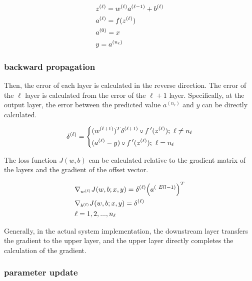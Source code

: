 \begin{content}
\begin{content}
\[\begin{gathered}
  {z^{(\ell )}} = {w^{(\ell )}}{a^{(\ell - 1)}} + {b^{(\ell )}} \hfill \\
  {a^{(\ell )}} = f({z^{(\ell )}}) \hfill \\
  {a^{(0)}} = x \hfill \\
  y = {a^{({n_\ell })}} \hfill \\ 
\end{gathered} \]

\subsubsection{backward propagation}

Then, the error of each layer is calculated in the reverse direction. The error of the $\ell$ layer is calculated from the error of the $\ell + 1$ layer. Specifically, at the output layer, the error between the predicted value $a^{({n_\ell })}$ and $y$ can be directly calculated.

\[{\delta ^{(\ell)}} = \left\{ \begin{gathered}
  {({w^{(\ell + 1)}})^T}{\delta ^{(\ell + 1)}} \circ f\,'({z^{(\ell)}}); {\text{ }}\ell \ne {n_\ell} \hfill \\
  ({a^{(\ell)}} - y) \circ f\,'({z^{(\ell)}}); {\text{ }}\ell = {n_\ell} \hfill \ \ 
\end{gathered} \right.\]

The loss function $J(w,b)$ can be calculated relative to the gradient matrix of the layers and the gradient of the offset vector.

\[\begin{gathered}
  {\nabla _{{w^{(\ell )}}}}J(w,b;x,y) = {\delta ^{(\ell )}}{\left( {{a^{(\ Ell - 1)}}} \right)^T} \hfill \\
  {\nabla _{{b^{(\ell )}}}}J(w,b;x,y) = {\delta ^{(\ell )}} \hfill \\
  \ell = 1,2,...,{n_\ell } \hfill \\ 
\end{gathered} \]

Generally, in the actual system implementation, the downstream layer transfers the gradient to the upper layer, and the upper layer directly completes the calculation of the gradient.

\subsubsection{parameter update}


\end{content}
\end{content}
